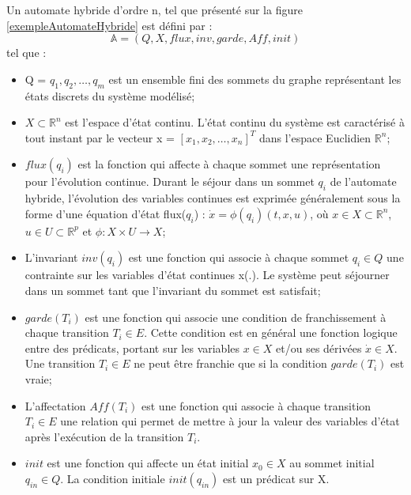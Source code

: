 \begin{definition}{Un automate hybride d'ordre n, tel que présenté sur la figure \ref{exempleAutomateHybride} est défini par :}\\
\[\mathbb{A} = (Q, X, flux, inv, garde, Aff, init)\]
tel que :
\label{def:autom-hybride}
\begin{itemize}
\item Q = {$q_1, q_2, \ldots, q_m$} est un ensemble fini des sommets du graphe représentant les états discrets du système modélisé;
\item $X \subset \mathbb{R}^n$ est l'espace d'état continu. L'état continu du système est caractérisé à tout instant par le vecteur x = $[x_1, x_2, \ldots, x_n]^T$ dans l'espace Euclidien $\mathbb{R}^n$;
\item $flux(q_i)$ est la fonction qui affecte à chaque sommet une représentation pour l'évolution continue. Durant le séjour dans un sommet $q_i$ de l'automate hybride, l'évolution des variables continues est exprimée généralement sous la forme d'une équation d'état flux($q_i$) : $\dot{x} = \phi (q_i)(t,x,u)$, où $x \in X \subset \mathbb{R}^n$, $u \in U \subset \mathbb{R}^p$ et $\phi : X \times U \rightarrow X$;
\item L'invariant $inv(q_i)$ est une fonction qui associe à chaque sommet $q_i \in Q$ une contrainte sur les variables d'état continues x(.). Le système peut séjourner dans un sommet tant que l'invariant du sommet est satisfait;
\item $garde(T_i)$ est une fonction qui associe une condition de franchissement à chaque transition $T_i \in E$. Cette condition est en général une fonction logique entre des prédicats, portant sur les variables $x \in X$ et/ou ses dérivées $\dot{x} \in X$. Une transition $T_i \in E$ ne peut être franchie que si la condition $garde(T_i)$ est vraie;
\item L'affectation $Aff(T_i)$ est une fonction qui associe à chaque transition $T_i \in E$ une relation qui permet de mettre à jour la valeur des variables d'état après l'exécution de la transition $T_i$.
\item $init$ est une fonction qui affecte un état initial $x_0 \in X$ au sommet initial $q_{in} \in Q$. La condition initiale $init(q_{in})$ est un prédicat sur X.
\end{itemize}



\end{definition}


